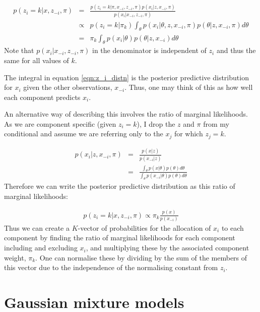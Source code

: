 \documentclass[12pt]{article} %
\begin{document}
	\begin{eqnarray}
		p(z_i = k | x, z_{-i}, \pi) &=& \frac{p(z_i = k | \pi, x_{-i}, z_{-i}, \pi) p(x_i | z, x_{-i}, \pi)}{p(x_i | x_{-i}, z_{-i}, \pi)} \label{eqn:placeholder} \\
		&\propto& p(z_i = k | \pi_k) \int_{\theta} p(x_i | \theta,  z, x_{-i}, \pi) p(\theta | z, x_{-i}, \pi) d \theta \\
		&=& \pi_k \int_{\theta} p(x_i | \theta) p(\theta | z, x_{-i}) d \theta \label{eqn:z_i_distn}
	\end{eqnarray}
	Note that $p(x_i | x_{-i}, z_{-i}, \pi)$ in the denominator is independent of $z_i$ and thus the same for all values of $k$.
	
	The integral in equation \ref{eqn:z_i_distn} is the posterior predictive distribution for $x_i$ given the other observations, $x_{-i}$. Thus, one may think of this as how well each component predicts $x_i$.
	
    An alternative way of describing this involves the ratio of marginal likelihoods. As we are component specific (given $z_i = k$), I drop the $z$ and $\pi$ from my conditional and assume we are referring only to the $x_j$ for which $z_j = k$.
    
    \begin{eqnarray}
    p(x_i | z, x_{-i}, \pi) &=& \frac{p(x | z)}{p(x_{-i} | z)} \\
      &=& \frac{\int_\theta p(x | \theta) p(\theta) d\theta}{\int_\theta p(x_{-i} | \theta) p(\theta) d\theta}
    \end{eqnarray}
    Therefore we can write the posterior predictive distribution as this ratio of marginal likelihoods:
    
    \begin{eqnarray}
    p(z_i = k | x, z_{-i}, \pi) \propto \pi_k \frac{p(x)}{p(x_{-i})}
    \end{eqnarray}
    Thus we can create a $K$-vector of probabilities for the allocation of $x_i$ to each component by finding the ratio of marginal likelihoods for each component including and excluding $x_i$, and multiplying these by the associated component weight, $\pi_k$. One can normalise these by dividing by the sum of the members of this vector due to the independence of the normalising constant from $z_i$.
	
	\section{Gaussian mixture models}
	
\end{document}
